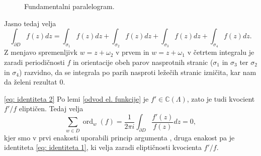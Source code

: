 \documentclass[mat1]{fmfdelo}
\numberwithin{equation}{section}
\newcommand{\C}{\mathbb C}
\newcommand{\om}{\omega}
\newcommand{\elf}{\C(\Lambda)}
\newcommand{\ord}[2]{\operatorname{ord}_{#1}(#2)}
\theoremstyle{definition}
\begin{document}
\begin{dokaz}
\begin{figure}[H]
        \caption{Fundamentalni paralelogram.}
        \label{fundamentalni paralelogram}
    \end{figure}


    Jasno tedaj velja
    \[
        \int_{\partial D} f(z)dz = \int_{\sigma_1} f(z)dz + \int_{\sigma_2} f(z)dz + \int_{\sigma_3} f(z)dz + \int_{\sigma_4} f(z)dz.
    \]
    Z menjavo spremenljivk $w = z + \om_2$ v prvem in $w = z + \om_1$ v četrtem integralu je zaradi periodičnosti $f$ in orientacije obeh parov nasprotnih stranic ($\sigma_1$ in $\sigma_3$ ter $\sigma_2$ in $\sigma_4$) razvidno, da se integrala po parih nasproti ležečih stranic izničita, kar nam da želeni rezultat $0$.
    
    \eqref{eq: identiteta 2} Po lemi \ref{odvod el. funkcije} je $f' \in \elf$, zato je tudi kvocient $f'/f$ eliptičen. Tedaj velja
    \[
        \sum_{w \in D} \ord{w}{f} = \frac{1}{2\pi i}\int_{\partial D} \frac{f'(z)}{f(z)}dz = 0, 
    \]
    kjer smo v prvi enakosti uporabili princip argumenta \cite[izrek 72]{Globevnik}, druga enakost pa je identiteta \eqref{eq: identiteta 1}, ki velja zaradi eliptičnosti kvocienta $f'/f$.


\end{dokaz}
\end{document}

